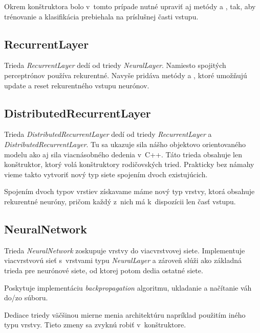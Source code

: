 Okrem konštruktora bolo v~tomto prípade nutné upraviť aj metódy  a , tak, aby trénovanie a klasifikácia prebiehala na príslušnej časti vstupu.

\subsection{RecurrentLayer}
Trieda \textit{RecurrentLayer} dedí od triedy \textit{NeuralLayer}. Namiesto spojitých perceptrónov používa rekurentné. Navyše pridáva metódy  a , ktoré umožňujú update a reset rekurentného vstupu neurónov.

\subsection{DistributedRecurrentLayer}
Trieda \textit{DistributedRecurrentLayer} dedí od triedy \textit{RecurrentLayer} a \textit{DistributedRecurrentLayer}. Tu sa ukazuje sila nášho objektovo orientovaného modelu ako aj sila viacnásobného dedenia v~C++. Táto trieda obsahuje len konštruktor, ktorý volá konštruktory rodičovských tried. Prakticky bez námahy vieme takto vytvoriť nový typ siete spojením dvoch existujúcich.

Spojením dvoch typov vrstiev získavame máme nový typ vrstvy, ktorá obsahuje rekurentné neuróny, pričom každý z~nich má k~dispozícii len časť vstupu.

\subsection{NeuralNetwork}
Trieda \textit{NeuralNetwork} zoskupuje vrstvy do viacvrstvovej siete. Implementuje viacvrstvovú sieť s~vrstvami typu \textit{NeuralLayer} a zároveň slúži ako základná trieda pre neurónové siete, od ktorej potom dedia ostatné siete.

Poskytuje implementáciu \textit{backpropagation} algoritmu, ukladanie a načítanie váh do/zo súboru. 

Dediace triedy väčšinou mierne menia architektúru napríklad použitím iného typu vrstvy. Tieto zmeny sa zvyknú robiť v~konštruktore.

